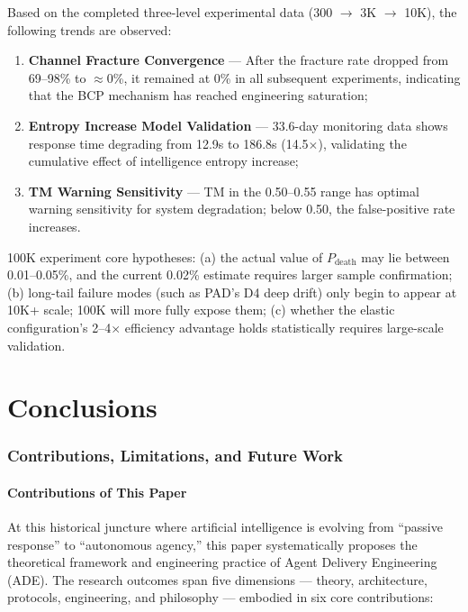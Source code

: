 \documentclass[11pt,a4paper]{article}
\begin{document}
Based on the completed three-level experimental data (300 $\rightarrow$ 3K $\rightarrow$ 10K), the following trends are observed:

\begin{enumerate}
\item \textbf{Channel Fracture Convergence} --- After the fracture rate dropped from 69--98\% to $\approx$0\%, it remained at 0\% in all subsequent experiments, indicating that the BCP mechanism has reached engineering saturation;
\item \textbf{Entropy Increase Model Validation} --- 33.6-day monitoring data shows response time degrading from 12.9s to 186.8s (14.5$\times$), validating the cumulative effect of intelligence entropy increase;
\item \textbf{TM Warning Sensitivity} --- TM in the 0.50--0.55 range has optimal warning sensitivity for system degradation; below 0.50, the false-positive rate increases.
\end{enumerate}

100K experiment core hypotheses: (a) the actual value of $P_{\text{death}}$ may lie between 0.01--0.05\%, and the current 0.02\% estimate requires larger sample confirmation; (b) long-tail failure modes (such as PAD's D4 deep drift) only begin to appear at 10K+ scale; 100K will more fully expose them; (c) whether the elastic configuration's 2--4$\times$ efficiency advantage holds statistically requires large-scale validation.

\part{Conclusions}
\label{part:IV}

\section{Contributions, Limitations, and Future Work}
\label{sec:12}

\subsection{Contributions of This Paper}
\label{sec:12.1}

At this historical juncture where artificial intelligence is evolving from ``passive response'' to ``autonomous agency,'' this paper systematically proposes the theoretical framework and engineering practice of Agent Delivery Engineering (ADE). The research outcomes span five dimensions --- theory, architecture, protocols, engineering, and philosophy --- embodied in six core contributions:
\end{document}
